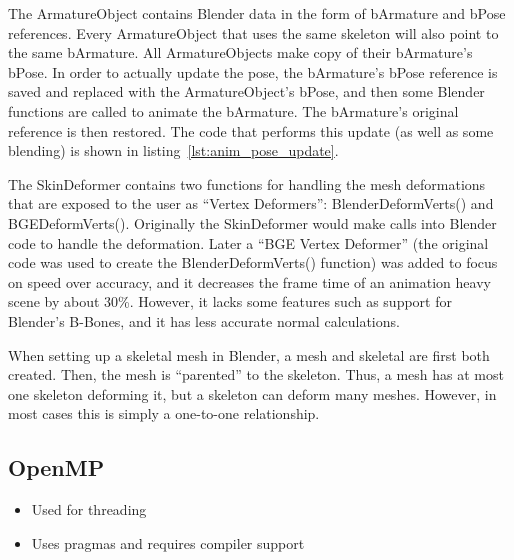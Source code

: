 The ArmatureObject contains Blender data in the form of bArmature and bPose references. Every ArmatureObject that uses the same skeleton will also point to the same bArmature. All ArmatureObjects make copy of their bArmature's bPose. In order to actually update the pose, the bArmature's bPose reference is saved and replaced with the ArmatureObject's bPose, and then some Blender functions are called to animate the bArmature. The bArmature's original reference is then restored. The code that performs this update (as well as some blending) is shown in listing~\ref{lst:anim_pose_update}.


The SkinDeformer contains two functions for handling the mesh deformations that are exposed to the user as ``Vertex Deformers'': BlenderDeformVerts() and BGEDeformVerts(). Originally the SkinDeformer would make calls into Blender code to handle the deformation. Later a ``BGE Vertex Deformer'' (the original code was used to create the BlenderDeformVerts() function) was added to focus on speed over accuracy, and it decreases the frame time of an animation heavy scene by about 30\%. However, it lacks some features such as support for Blender's B-Bones, and it has less accurate normal calculations.

When setting up a skeletal mesh in Blender, a mesh and skeletal are first both created. Then, the mesh is ``parented'' to the skeleton. Thus, a mesh has at most one skeleton deforming it, but a skeleton can deform many meshes. However, in most cases this is simply a one-to-one relationship.

\subsection{OpenMP}
\ifsummaries
\begin{itemize}
 \item Used for threading
 \item Uses pragmas and requires compiler support
\end{itemize}
\fi


%
